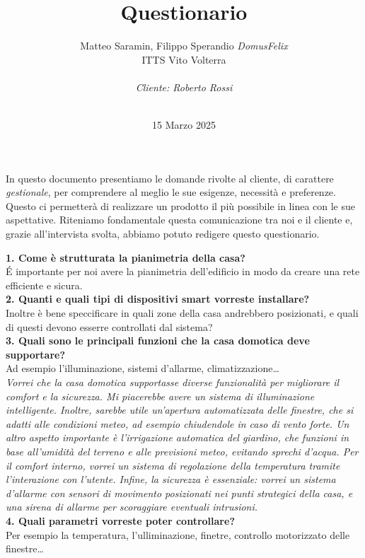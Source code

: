 \documentclass{exam}
\title{Questionario}
\author{Matteo Saramin, Filippo Sperandio \textit{DomusFelix} \\ {\small ITTS Vito Volterra} \\ \\ \emph{Cliente: Roberto Rossi}}
\date{\version\\ 15 Marzo 2025}
\begin{document}
\maketitle
\vspace{5mm}
In questo documento presentiamo le domande rivolte al cliente, di carattere \emph{gestionale},
per comprendere al meglio le sue esigenze, necessità e preferenze. 
Questo ci permetterà di realizzare un prodotto il più possibile in linea con le sue aspettative. 
Riteniamo fondamentale questa comunicazione tra noi e il cliente e, grazie all'intervista svolta, abbiamo potuto redigere questo questionario.

\clearpage
\noindent\textbf{1. Come è strutturata la pianimetria della casa?}\\[1.5mm]
É importante per noi avere la pianimetria dell'edificio in modo da creare una rete efficiente e sicura.\\

\clearpage
\noindent\textbf{2. Quanti e quali tipi di dispositivi smart vorreste installare?}\\[1.5mm]
Inoltre è bene speccificare in quali zone della casa andrebbero posizionati, e quali di questi devono esserre controllati dal sistema?\\

\clearpage
\noindent\textbf{3. Quali sono le principali funzioni che la casa domotica deve supportare?}\\[1.5mm]
Ad esempio l'illuminazione, sistemi d'allarme, climatizzazione\ldots\\[2mm]
\emph{Vorrei che la casa domotica supportasse diverse funzionalità per migliorare il comfort e la sicurezza. Mi piacerebbe avere un sistema di illuminazione intelligente. Inoltre, sarebbe utile un’apertura automatizzata delle finestre, che si adatti alle condizioni meteo, ad esempio chiudendole in caso di vento forte.
Un altro aspetto importante è l’irrigazione automatica del giardino, che funzioni in base all’umidità del terreno e alle previsioni meteo, evitando sprechi d’acqua. Per il comfort interno, vorrei un sistema di regolazione della temperatura tramite l'interazione con l'utente. Infine, la sicurezza è essenziale: vorrei un sistema d’allarme con sensori di movimento posizionati nei punti strategici della casa, e una sirena di allarme per scoraggiare eventuali intrusioni.}\\

\clearpage
\noindent\textbf{4. Quali parametri vorreste poter controllare?}\\[1.5mm]
Per esempio la temperatura, l'ulliminazione, finetre, controllo motorizzato delle finestre\ldots
\end{document}
